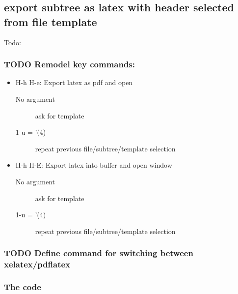\documentclass[10pt]{article}
\begin{document}
\subsection{export subtree as latex with header selected from file template}
\label{sec-11-1}

Todo:

\subsubsection{{\bfseries\sffamily TODO} Remodel key commands:}
\label{sec-11-1-1}
\begin{itemize}
\item H-h H-e: Export latex as pdf and open
\begin{description}
\item[{No argument}] ask for template
\item[{1-u = '(4)}] repeat previous file/subtree/template selection
\end{description}
\item H-h H-E: Export latex into buffer and open window
\begin{description}
\item[{No argument}] ask for template
\item[{1-u = '(4)}] repeat previous file/subtree/template selection
\end{description}
\end{itemize}

\subsubsection{{\bfseries\sffamily TODO} Define command for switching between xelatex/pdflatex}
\label{sec-11-1-2}

\subsubsection{The code}
\label{sec-11-1-3}
\end{document}
